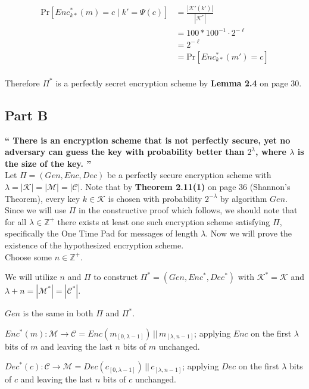 \documentclass{article}
\newcommand{\HomeworkText}[1]{\textbf{``#1''}\\}
\begin{document}
   	\begin{equation}
    \begin{split}
    	\text{Pr}[Enc^*_{k*}(m) = c \;|\; k' = \Psi(c)]
    & = \frac{|\mathcal{K}'(k')|}{|\mathcal{K}^*|} \\
    & = 100 * 100^{-1}\cdot2^{-\ell} \\
    & = 2^{-\ell} \\
    & = \text{Pr}[Enc^*_{k*}(m') = c] \\
    \end{split}
    \end{equation}
    
    Therefore $\Pi^*$ is a perfectly secret encryption scheme by \textbf{Lemma 2.4} on page 30.
	

	\subsection*{Part B}
	\HomeworkText{
		There is an encryption scheme that is not perfectly secure, yet no adversary can guess the key with probability better than $2^{\lambda}$, where $\lambda$ is the size of the key.
	}

    Let $\Pi = (Gen,Enc,Dec)$ be a perfectly secure encryption scheme with $\lambda = |\mathcal{K}| = |\mathcal{M}| = |\mathcal{C}|$.
    Note that by \textbf{Theorem 2.11(1)} on page 36 (Shannon's Theorem), every key $k \in \mathcal{K}$ is chosen with probability $2^{-\lambda}$ by algorithm $Gen$.
    Since we will use $\Pi$ in the constructive proof which follows, we should note that for all $\lambda \in \mathbb{Z}^{+}$ there exists at least one such encryption scheme satisfying $\Pi$, specifically the One Time Pad for messages of length $\lambda$.
    Now we will prove the existence of the hypothesized encryption scheme.\\ 
    
    Choose some $n \in \mathbb{Z}^{+}$.
    
    We will utilize  $n$ and $\Pi$ to construct $\Pi^{*} = (Gen,Enc^{*},Dec^{*})$ with $\mathcal{K}^{*} = \mathcal{K}$ and $\lambda + n = |\mathcal{M}^{*}| = |\mathcal{C}^{*}|$. 
    
    $Gen$ is the same in both $\Pi$ and $\Pi^{*}$. 
    
    $Enc^{*}(m) : \mathcal{M} \to \mathcal{C} = Enc(m_{[0,\lambda-1]}) \,||\, m_{[\lambda,n-1]}$; applying $Enc$ on the first $\lambda$ bits of $m$ and leaving the last $n$ bits of $m$ unchanged. 
    
    $Dec^{*}(c) : \mathcal{C} \to \mathcal{M} = Dec(c_{[0,\lambda-1]}) \,||\, c_{[\lambda,n-1]}$; applying $Dec$ on the first $\lambda$ bits of $c$ and leaving the last $n$ bits of $c$ unchanged.\\
    
\end{document}
